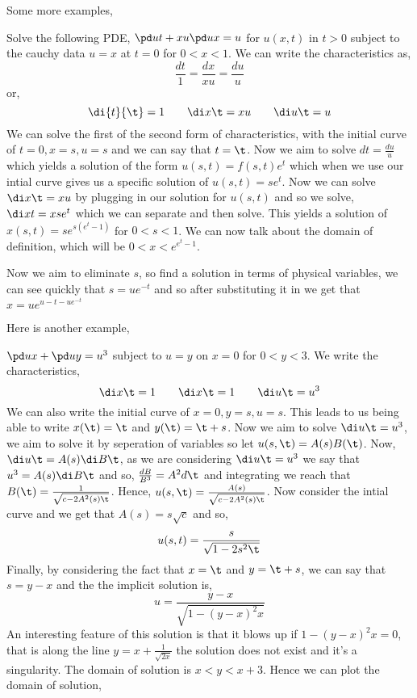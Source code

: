 Some more examples,
\begin{eg}
  Solve the following PDE, $\pd u t + xu\pd u x = u$ for $u(x, t)$ in $t > 0$ subject to the cauchy data $u = x$ at $t = 0$ for $0 < x < 1$. We can write the characteristics as,
  $$ \frac{dt}{1} = \frac{dx}{xu} = \frac{du}{u} $$
  or,
  $$ \di{t}{\t} = 1 \qquad \di x \t = xu \qquad \di u \t = u $$
  We can solve the first of the second form of characteristics, with the initial curve of $t = 0, x = s, u = s$ and we can say that $t = \t$. Now we aim to solve $dt = \frac{du}{u}$ which yields a solution of the form $u(s, t)= f(s, t)e^t$ which when we use our intial curve gives us a specific solution of $u(s, t) = se^t$. Now we can solve $\di x \t = xu$ by plugging in our solution for $u(s, t)$ and so we solve, $\di x t = xse^t$ which we can separate and then solve. This yields a solution of $x(s, t) = se^{s(e^t - 1)}$ for $0 < s < 1$. We can now talk about the domain of definition, which will be $0 < x < e^{e^t - 1}$.

  Now we aim to eliminate $s$, so find a solution in terms of physical variables, we can see quickly that $s = ue^{-t}$ and so after substituting it in we get that $x = ue^{u - t - ue^{-t}}$
\end{eg}

Here is another example,
\begin{eg}
  $\pd u x + \pd u y = u^3$ subject to $u = y$ on $x = 0$ for $0 < y < 3$. We write the characteristics,
  $$ \di x \t = 1 \qquad \di x \t = 1 \qquad \di u \t = u^3 $$
  We can also write the initial curve of $x = 0, y = s, u = s$. This leads to us being able to write $x(\t) = \t$ and $y(\t) = \t + s$. Now we aim to solve $\di u \t = u^3$, we aim to solve it by seperation of variables so let $u(s, \t) = A(s)B(\t)$. Now, $\di u \t = A(s)\di B \t$, as we are considering $\di u \t = u^3$ we say that $u^3 = A(s)\di B \t$ and so, $\frac{dB}{B^3} = A^2 d\t$ and integrating we reach that $B(\t) = \frac{1}{\sqrt{c - 2A^2(s)\t}}$. Hence, $u(s, \t) = \frac{A(s)}{\sqrt{c - 2A^2(s)\t}}$.
  Now consider the intial curve and we get that $A(s) = s\sqrt c$ and so,
  $$ u(s, t) = \frac{s}{\sqrt{1 - 2s^2\t}} $$
  Finally, by considering the fact that $x = \t$ and $y = \t + s$, we can say that $s = y - x$ and the the implicit solution is,
  $$ u = \frac{y - x}{\sqrt{1 - (y-x)^2x}} $$
  An interesting feature of this solution is that it blows up if $1 - (y - x)^2x = 0$, that is along the line $y = x + \frac{1}{\sqrt{2x}}$ the solution does not exist and it's a singularity. The domain of solution is $x < y < x + 3$. Hence we can plot the domain of solution,
\end{eg}

